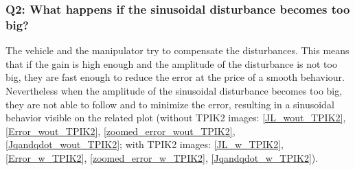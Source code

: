 \documentclass{article}
\begin{document}
\subsubsection{Q2: What happens if the sinusoidal disturbance becomes too big?}
The vehicle and the manipulator try to compensate the disturbances. This means that if the gain is high enough and the amplitude of the disturbance is not too big, they are fast enough to reduce the error at the price of a smooth behaviour. Nevertheless when the amplitude of the sinusoidal disturbance becomes too big, they are not able to follow and to minimize the error, resulting in a sinusoidal behavior visible on the related plot (without TPIK2 images: \ref{JL_wout_TPIK2}, \ref{Error_wout_TPIK2}, \ref{zoomed_error_wout_TPIK2}, \ref{Jqandqdot_wout_TPIK2}; with TPIK2 images: \ref{JL_w_TPIK2}, \ref{Error_w_TPIK2}, \ref{zoomed_error_w_TPIK2}, \ref{Jqandqdot_w_TPIK2}).
\end{document}

